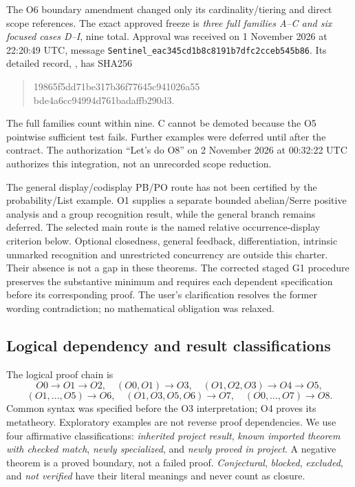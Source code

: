 \documentclass[11pt,a4paper]{article}
\theoremstyle{definition}
\begin{document}
The O6 boundary amendment changed only its cardinality/tiering and direct
scope references. The exact approved freeze is \emph{three full families
A--C and six focused cases D--I}, nine total. Approval was received on
1 November 2026 at 22:20:49 UTC, message
\texttt{Sentinel\_eac345cd1b8c8191b7dfc2cceb545b86}.
Its detailed record, , has SHA256
\begin{quote}\small\ttfamily
19865f5dd71be317b36f77645c941026a55\\
bde4a6cc94994d761badaffb290d3.
\end{quote}
The full families count within nine. C cannot be demoted because the O5
pointwise sufficient test fails. Further examples were deferred until after
the contract. The authorization ``Let's do O8'' on 2 November 2026 at
00:32:22 UTC authorizes this integration, not an unrecorded scope reduction.

The general display/codisplay PB/PO route has not been certified by the
probability/List example. O1 supplies a separate bounded abelian/Serre
positive analysis and a group recognition result, while the general branch
remains deferred. The selected main route is the named relative
occurrence-display criterion below. Optional closedness, general feedback,
differentiation, intrinsic unmarked recognition and unrestricted concurrency
are outside this charter. Their absence is not a gap in these theorems.
The corrected staged G1 procedure preserves the substantive minimum and
requires each dependent specification before its corresponding proof.
The user's clarification resolves the former wording contradiction; no
mathematical obligation was relaxed.

\subsection{Logical dependency and result classifications}
The logical proof chain is
\[
 O0\to O1\to O2,\quad (O0,O1)\to O3,\quad
 (O1,O2,O3)\to O4\to O5,
\]
\[
 (O1,\ldots,O5)\to O6,\quad (O1,O3,O5,O6)\to O7,
 \quad (O0,\ldots,O7)\to O8.
\]
Common syntax was specified before the O3 interpretation; O4 proves its
metatheory. Exploratory examples are not reverse proof dependencies.
We use four affirmative classifications: \emph{inherited project result},
\emph{known imported theorem with checked match}, \emph{newly specialized},
and \emph{newly proved in project}. A negative theorem is a proved boundary,
not a failed proof. \emph{Conjectural}, \emph{blocked}, \emph{excluded}, and
\emph{not verified} have their literal meanings and never count as closure.
\end{document}
